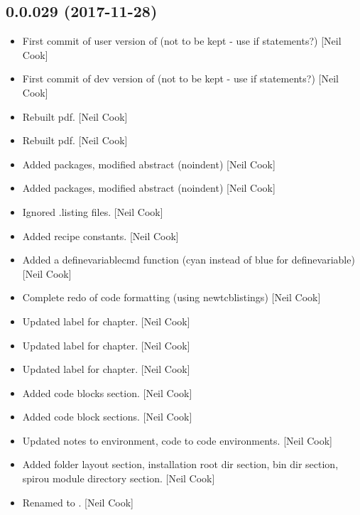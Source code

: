 \documentclass[a4paper,10pt,english]{report}
\begin{document}
\subsection{0.0.029 (2017-11-28)}
\label{\detokenize{misc/changelog:id522}}\begin{itemize}
\item {} 
First commit of user version of  (not to be kept -
use if statements?) {[}Neil Cook{]}

\item {} 
First commit of dev version of  (not to be kept - use
if statements?) {[}Neil Cook{]}

\item {} 
Rebuilt pdf. {[}Neil Cook{]}

\item {} 
Rebuilt pdf. {[}Neil Cook{]}

\item {} 
Added packages, modified abstract (noindent) {[}Neil Cook{]}

\item {} 
Added packages, modified abstract (noindent) {[}Neil Cook{]}

\item {} 
Ignored .listing files. {[}Neil Cook{]}

\item {} 
Added recipe constants. {[}Neil Cook{]}

\item {} 
Added a definevariablecmd function (cyan instead of blue for
definevariable) {[}Neil Cook{]}

\item {} 
Complete redo of code formatting (using newtcblistings) {[}Neil Cook{]}

\item {} 
Updated label for chapter. {[}Neil Cook{]}

\item {} 
Updated label for chapter. {[}Neil Cook{]}

\item {} 
Updated label for chapter. {[}Neil Cook{]}

\item {} 
Added code blocks section. {[}Neil Cook{]}

\item {} 
Added code block sections. {[}Neil Cook{]}

\item {} 
Updated notes to environment, code to code environments. {[}Neil Cook{]}

\item {} 
Added folder layout section, installation root dir section, bin dir
section, spirou module directory section. {[}Neil Cook{]}

\item {} 
Renamed  to . {[}Neil Cook{]}

\end{itemize}
\end{document}
